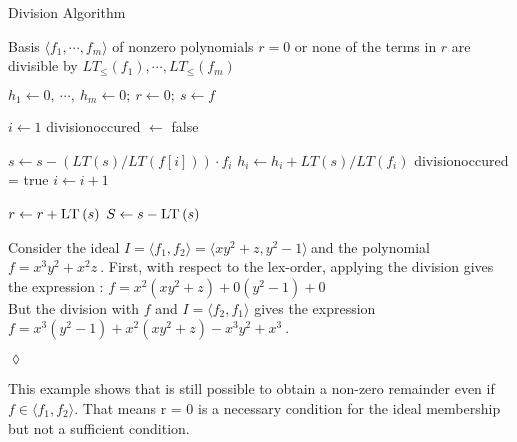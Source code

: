 \newpage


\begin{algorithm}
\caption{Division Algorithm \cite{KHZ}}
\label{alg:division}
\begin{algorithmic}[1]

\Require Basis $\langle f_{1}, \cdots, f_{m}\rangle$ of nonzero polynomials  
\Ensure $r=0$ or none of the terms in $r$ are divisible by $ LT_{\leq}\left( f_{1}\right) , \cdots , LT_{\leq} \left( f_{m}\right) $

\State $ h_{1} \gets 0 ,~\cdots ,~h_{m} \gets 0;~r \gets 0;~s \gets f  $

\State $ i \gets 1 $
\State  division\textunderscore occured $ \gets $  false 

\State $ s \gets s - ( LT \left( s\right)/ LT \left( f \left[ i\right] \right))  \cdot f_{i} $
\State $h_{i} \gets h_{i} + LT\left( s\right) / LT\left( f_{i}\right) $
\State division\textunderscore occured = true
\Else
\State $i \gets i+1$
\EndIf
\EndWhile

\State $ r \gets r + \textsc{LT}\left( s\right) $
\State $ S \gets s - \textsc{LT}\left( s\right) $
\EndIf

\EndWhile


\end{algorithmic}
\end{algorithm}


\begin{env_example}\normalfont
Consider the ideal $I = \langle f_{1},f_{2} \rangle = \langle xy^{2}+z,y^{2}-1 \rangle~$and the polynomial $f = x^{3}y^{2}+x^{2}z~$.
First, with respect to the lex-order, applying the division gives the expression : $f = x^{2}(xy^{2}+z) + 0(y^{2}-1) + 0$ \\
But the division with $f$ and $I = \langle f_{2},f_{1} \rangle$ gives the expression \\ $f = x^{3}(y^{2}-1) + x^{2}(xy^{2}+z) -x^{3}y^{2}+x^{3}~$.
\begin{flushright}
$\lozenge$
\end{flushright}
\end{env_example}



This example shows that is still possible to obtain a non-zero remainder even if $f \in \langle f_{1},f_{2} \rangle $. That means r = 0 is a  necessary condition for the ideal membership but not a sufficient condition.
